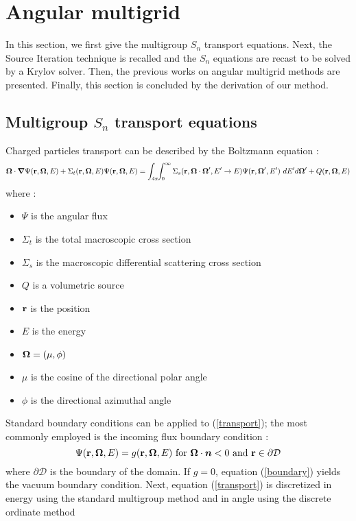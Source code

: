 \section{Angular multigrid}
In this section, we first give the multigroup $S_n$ transport equations. Next,
the Source Iteration technique is recalled and the $S_n$ equations are
recast to be solved by a Krylov solver. Then, the previous works on angular
multigrid methods are presented. Finally, this section is concluded by the derivation
of our method.  
\subsection{Multigroup $S_n$ transport equations} 
Charged particles transport can be described by the Boltzmann equation :
\begin{equation}
\boldsymbol{\Omega} \cdot \boldsymbol{\nabla} \Psi(\mathbf{r},\boldsymbol{\Omega},E) + \Sigma_t(\mathbf{r},\boldsymbol{\Omega},E) \Psi(\mathbf{r},\boldsymbol{\Omega},E) =
\int_{4\pi}\!\!\int_{0}^{\infty}\Sigma_s(\mathbf{r},\boldsymbol{\Omega}\cdot\boldsymbol{\Omega}',E'\rightarrow
E)\Psi(\mathbf{r},\boldsymbol{\Omega}',E')\ dE'd\boldsymbol{\Omega}'+Q(\mathbf{r},\boldsymbol{\Omega},E) 
\label{transport}
\end{equation}
where :
\begin{itemize}
\item $\Psi$ is the angular flux
\item $\Sigma_t$ is the total macroscopic cross section
\item $\Sigma_s$ is the macroscopic differential scattering cross section
\item $Q$ is a volumetric source
\item $\mathbf{r}$ is the position
\item $E$ is the energy
\item $\boldsymbol{\Omega} = (\mu,\phi)$
\item $\mu$ is the cosine of the directional polar angle
\item $\phi$ is the directional azimuthal angle
\end{itemize}
Standard boundary conditions can be applied to (\ref{transport}); the most
commonly employed is the incoming flux boundary condition :
\begin{equation}
\Psi(\mathbf{r},\boldsymbol{\Omega},E) = g(\mathbf{r},\boldsymbol{\Omega},E)\textrm{ for }\boldsymbol{\Omega}\cdot\boldsymbol{n}<0\textrm{ and
}\mathbf{r}\in \partial \mathcal{D}
\label{boundary}
\end{equation} 
where $\partial \mathcal{D}$ is the boundary of the domain. If $g=0$, equation
(\ref{boundary}) yields the vacuum boundary condition.
Next, equation (\ref{transport}) is discretized in energy using the standard 
multigroup method \cite{reuss} and in angle using the discrete ordinate method
